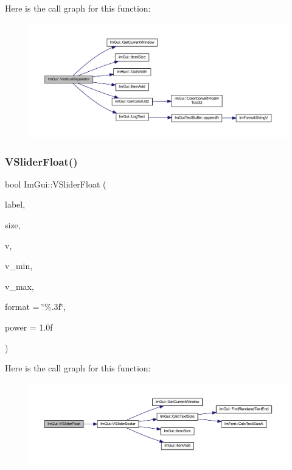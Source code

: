 Here is the call graph for this function\+:
\nopagebreak
\begin{figure}[H]
\begin{center}
\leavevmode
\includegraphics[width=350pt]{namespace_im_gui_ae60f7b8ece8808c477796e6594c8d796_cgraph}
\end{center}
\end{figure}
\mbox{\label{namespace_im_gui_a7ea15bc568ae408a53fb91862693a224}} 
\subsubsection{\texorpdfstring{V\+Slider\+Float()}{VSliderFloat()}}
{\footnotesize\ttfamily bool Im\+Gui\+::\+V\+Slider\+Float (\begin{DoxyParamCaption}\item[{const char $\ast$}]{label,  }\item[{const \mbox{\hyperlink{struct_im_vec2}{Im\+Vec2}} \&}]{size,  }\item[{float $\ast$}]{v,  }\item[{float}]{v\+\_\+min,  }\item[{float}]{v\+\_\+max,  }\item[{const char $\ast$}]{format = {\ttfamily \char`\"{}\%.3f\char`\"{}},  }\item[{float}]{power = {\ttfamily 1.0f} }\end{DoxyParamCaption})}

Here is the call graph for this function\+:
\nopagebreak
\begin{figure}[H]
\begin{center}
\leavevmode
\includegraphics[width=350pt]{namespace_im_gui_a7ea15bc568ae408a53fb91862693a224_cgraph}
\end{center}
\end{figure}
\mbox{\label{namespace_im_gui_a8adb506ea3ac2648a1f7655297b593c8}} 
